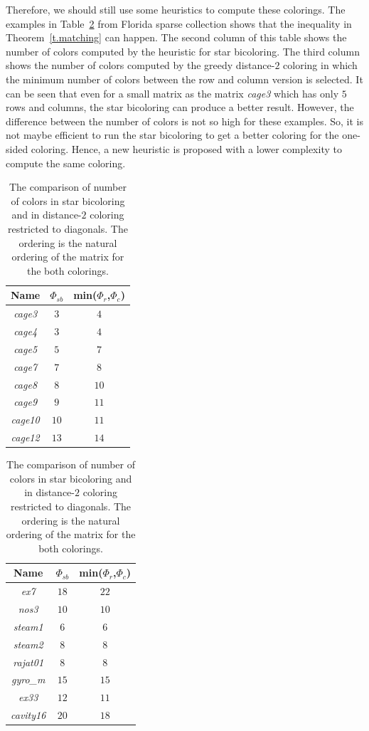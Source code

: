 \documentclass[12pt, twoside,a4paper,toc=bibliography]{scrbook}
\begin{document}
Therefore, we should still use some heuristics to compute these colorings.
The examples in Table~\ref{table.starbic.d2.diag} from Florida sparse collection shows that the
inequality in Theorem~\ref{t.matching} can happen. The second column of this table
shows the number of colors computed by the heuristic for star bicoloring.
The third column shows the number of colors computed by the greedy distance-$2$ coloring
in which the minimum number of colors between the row and column version is selected.
It can be seen that even for a small matrix as the matrix \textit{cage3} which has only
$5$ rows and columns, the star bicoloring can produce a better result.
However, the difference between the number of colors is not so high for these examples.
So, it is not maybe efficient to run the star bicoloring to get a better coloring for
the one-sided coloring. Hence, a new heuristic is proposed with a lower complexity
to compute the same coloring.
\begin{table}
\centering
\begin{tabular}{|c|c|c|}
\hline
Name & $\Phi_{sb}$ & min($\Phi_r$,$\Phi_c$)\\\hline
\textit{cage3} & $3$ & $4$\\\hline
\textit{cage4} & $3$ & $4$ \\\hline
\textit{cage5} & $5$ & $7$\\\hline
\textit{cage7} & $7$  & $8$\\\hline
\textit{cage8} & $8$  & $10$\\\hline
\textit{cage9} & $9$  & $11$\\\hline
\textit{cage10} & $10$ & $11$\\\hline
\textit{cage12} & $13$ &  $14$\\\hline
\end{tabular}
\hfill
\begin{tabular}{|c|c|c|}
\hline
Name & $\Phi_{sb}$ & min($\Phi_r$,$\Phi_c$)\\\hline
\textit{ex7} & $18$ & $22$ \\\hline
\textit{nos3} & $10$ & $10$ \\\hline
\textit{steam1} & $6$ & $6$ \\\hline
\textit{steam2} & $8$ & $8$ \\\hline
\textit{rajat01} & $8$ & $8$ \\\hline
\textit{gyro\_m} & $15$ & $15$\\\hline
\textit{ex33} & $12$ & $11$\\\hline
\textit{cavity16} & $20$ & $18$ \\\hline
\end{tabular}

\caption{The comparison of number of colors in star bicoloring and in
distance-$2$ coloring restricted to diagonals.
The ordering is the natural ordering of the matrix for the both colorings.
}
\label{table.starbic.d2.diag}
\end{table}
\end{document}
